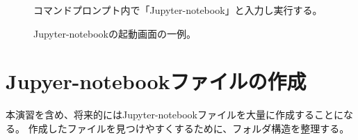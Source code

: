 \begin{figure}[htbp]
	\centering
	\caption{
		\label{fig:Anaconda_launch2}
		コマンドプロンプト内で「Jupyter-notebook」と入力し実行する。
	}
\end{figure}

\begin{figure}[htbp]
	\centering
	\caption{
		\label{fig:Anaconda_launch3}
		Jupyter-notebookの起動画面の一例。
	}
\end{figure}





\section{Jupyer-notebookファイルの作成}
本演習を含め、将来的にはJupyter-notebookファイルを大量に作成することになる。
作成したファイルを見つけやすくするために、フォルダ構造を整理する。


